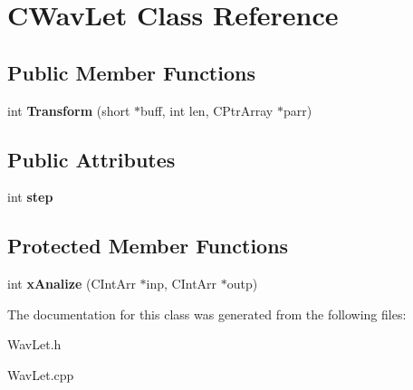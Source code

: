 \hypertarget{class_c_wav_let}{\section{C\-Wav\-Let Class Reference}
\label{class_c_wav_let}
}
\subsection*{Public Member Functions}
\begin{DoxyCompactItemize}
\item 
\hypertarget{class_c_wav_let_a69f031239d5ac8e31b7169d9d7fb649c}{int {\bfseries Transform} (short $\ast$buff, int len, C\-Ptr\-Array $\ast$parr)}\label{class_c_wav_let_a69f031239d5ac8e31b7169d9d7fb649c}

\end{DoxyCompactItemize}
\subsection*{Public Attributes}
\begin{DoxyCompactItemize}
\item 
\hypertarget{class_c_wav_let_a65ede1f1106b069f79e26d3421c1f63f}{int {\bfseries step}}\label{class_c_wav_let_a65ede1f1106b069f79e26d3421c1f63f}

\end{DoxyCompactItemize}
\subsection*{Protected Member Functions}
\begin{DoxyCompactItemize}
\item 
\hypertarget{class_c_wav_let_a568615486eb9ad953441f7e995c2de6d}{int {\bfseries x\-Analize} (C\-Int\-Arr $\ast$inp, C\-Int\-Arr $\ast$outp)}\label{class_c_wav_let_a568615486eb9ad953441f7e995c2de6d}

\end{DoxyCompactItemize}


The documentation for this class was generated from the following files\-:\begin{DoxyCompactItemize}
\item 
Wav\-Let.\-h\item 
Wav\-Let.\-cpp\end{DoxyCompactItemize}
